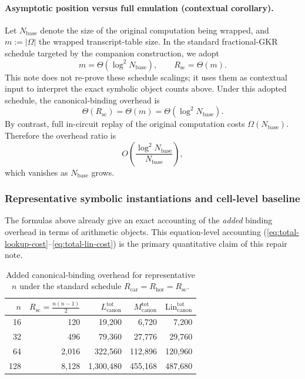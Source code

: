 ﻿\documentclass[11pt]{article}
\begin{document}
\paragraph{Asymptotic position versus full emulation (contextual corollary).}
Let \(N_{\mathrm{base}}\) denote the size of the original computation being
wrapped, and \(m:=|\Omega|\) the wrapped transcript-table size. In the standard
fractional-GKR schedule targeted by the companion construction, we adopt
\[
m=\Theta(\log^2 N_{\mathrm{base}}),
\qquad
R_{\mathrm{sc}}=\Theta(m).
\]
This note does not re-prove these schedule scalings; it uses them as contextual
input to interpret the exact symbolic object counts above. Under this adopted
schedule, the canonical-binding overhead is
\[
\Theta(R_{\mathrm{sc}})
=
\Theta(m)
=
\Theta(\log^2 N_{\mathrm{base}}).
\]
By contrast, full in-circuit replay of the original computation costs
\(\Omega(N_{\mathrm{base}})\). Therefore the overhead ratio is
\[
O\!\left(\frac{\log^2 N_{\mathrm{base}}}{N_{\mathrm{base}}}\right),
\]
which vanishes as \(N_{\mathrm{base}}\) grows.

\subsubsection{Representative symbolic instantiations and cell-level baseline}

The formulas above already give an exact accounting of the \emph{added} binding
overhead in terms of arithmetic objects. This equation-level accounting
(\eqref{eq:total-lookup-cost}--\eqref{eq:total-lin-cost}) is the primary
quantitative claim of this repair note.

\begin{table}[t]
\centering
\small
\setlength{\tabcolsep}{6pt}
\begin{tabular}{|r|r|r|r|r|}
\hline
\(n\) & \(R_{\mathrm{sc}}=\frac{n(n-1)}{2}\) & \(L_{\mathrm{canon}}^{\mathrm{tot}}\) & \(M_{\mathrm{canon}}^{\mathrm{tot}}\) & \(\mathrm{Lin}_{\mathrm{canon}}^{\mathrm{tot}}\) \\
\hline
16  & 120  & 19,200    & 6,720    & 7,200 \\
32  & 496  & 79,360    & 27,776   & 29,760 \\
64  & 2,016 & 322,560   & 112,896  & 120,960 \\
128 & 8,128 & 1,300,480 & 455,168  & 487,680 \\
\hline
\end{tabular}
\caption{Added canonical-binding overhead for representative \(n\) under the
standard schedule \(R_{\mathrm{car}}=R_{\mathrm{hor}}=R_{\mathrm{sc}}\).}
\label{tab:canon-overhead-bench}
\end{table}
\end{document}
